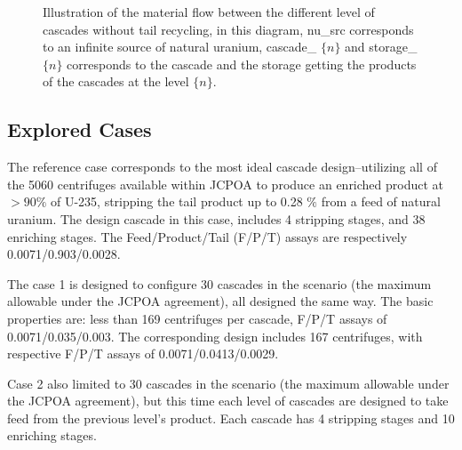 \documentclass{anstrans}
\begin{document}
\begin{figure}[ht]
  \caption{Illustration of the material flow between the different level of
      cascades without tail recycling, in this diagram, nu\_src corresponds to an
  infinite source of natural uranium, cascade\_ $\{n\}$ and storage\_ $\{n\}$
      corresponds to the cascade and the storage getting the
      products of the cascades at the level $\{n\}$.}\label{fig:flow}
\end{figure}

\subsection{Explored Cases}

The reference case corresponds to the most ideal cascade design--utilizing all
of the 5060 centrifuges available within JCPOA to produce an enriched product at
$>90\%$ of U-235, stripping the tail product up to 0.28 $\%$ from a feed of
natural uranium.  The design cascade in this case, includes 4 stripping stages,
and 38 enriching stages. The Feed/Product/Tail (F/P/T) assays are respectively
0.0071/0.903/0.0028.


The case 1 is designed to configure 30 cascades in the scenario (the maximum
allowable under the JCPOA agreement), all designed the same way. The basic
properties are: less than 169 centrifuges per cascade, F/P/T assays of
0.0071/0.035/0.003. The corresponding design includes 167 centrifuges, with
respective F/P/T assays of 0.0071/0.0413/0.0029.


Case 2 also limited to 30 cascades in the scenario (the maximum allowable under
the JCPOA agreement), but this time each level of cascades are designed to take
feed from the previous level's product. Each cascade has 4 stripping stages and
10 enriching stages.
\end{document}
